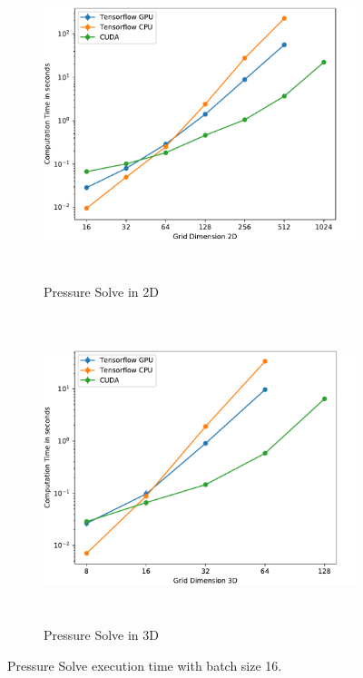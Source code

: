\begin{figure}[t]
\centering
	\begin{subfigure}[b]{1\textwidth}
		\centering
		\includegraphics[height=9cm, width=14cm]{figures/2d_bs16}

		\caption{Pressure Solve in 2D}
	\end{subfigure}
	\begin{subfigure}[b]{1\textwidth}
		\centering
		\includegraphics[height=9cm, width=14cm]{figures/3d_bs16}

		\caption{Pressure Solve in 3D}
	\end{subfigure}

\caption{Pressure Solve execution time with batch size 16.} \label{fig:perfbs16}
\end{figure}


\clearpage
